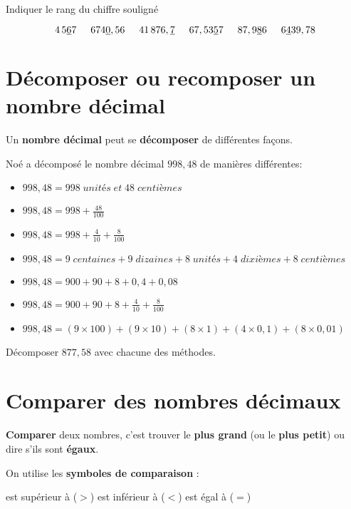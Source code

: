 \documentclass[a4paper,dvipsnames]{article}
\begin{document}
\begin{ExOApp}[]
Indiquer le rang du chiffre souligné

\[4\,5\underline{6}7 \hspace{.5cm} 674\underline{0},56 \hspace{.5cm} 41\,876,\underline{7} \hspace{.5cm} 67,53\underline{5}7 \hspace{.5cm} 87,9\underline{8}6 \hspace{.5cm} 6 \underline{4}39,78\]
\end{ExOApp} 

\section{Décomposer ou recomposer un nombre décimal}

\begin{Prop}
Un \textbf{nombre décimal} peut se \textbf{décomposer} de différentes façons.
\end{Prop}

\begin{Mt}
Noé a décomposé le nombre décimal $998,48$ de manières différentes:
\begin{itemize}
\item $998,48=998\;unités\;et\;48\;centièmes$
\item $998,48=998+\frac{48}{100}$
\item $998,48=998+\frac{4}{10}+\frac{8}{100}$
\item $998,48=9\;centaines+9\;dizaines+8\;unités
+4\;dixièmes+8\;centièmes$
\item $998,48=900+90+8+0,4+0,08$
\item $998,48=900+90+8+\frac{4}{10}+\frac{8}{100}$
\item $998,48=(9\times100)+(9\times10)+(8\times1)
+(4\times0,1)+(8\times0,01)$
\end{itemize}
\end{Mt}

\begin{ExOApp}[]
Décomposer $877,58$ avec chacune des méthodes.
\end{ExOApp}

\section{Comparer des nombres décimaux}

\begin{Def}
\textbf{Comparer} deux nombres, c'est trouver le \textbf{plus grand} (ou le \textbf{plus petit}) ou dire s'ils sont \textbf{égaux}.

On utilise les \textbf{symboles de comparaison} :
\begin{center}
est supérieur à ($>$) \hspace{1cm} est inférieur à ($<$) \hspace{1cm} est égal à ($=$)
\end{center}
\end{Def}
\end{document}
